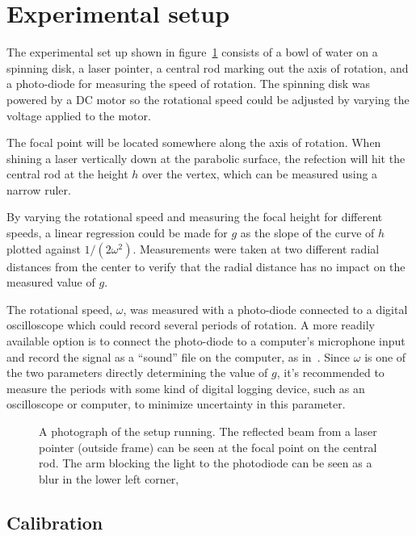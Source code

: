 \documentclass[12pt, a4paper, twocolumn]{article}
\begin{document}
\section{Experimental setup}

The experimental set up shown in figure~\ref{fig:rot_bowl_pic} consists of a bowl of water on a spinning disk, a laser pointer, a central rod marking out the axis of rotation, and a photo-diode for measuring the speed of rotation. The spinning disk was powered by a DC motor so the rotational speed could be adjusted by varying the voltage applied to the motor. 

The focal point will be located somewhere along the axis of rotation. When shining a laser vertically down at the parabolic surface, the refection will hit the central rod at the height $h$ over the vertex, which can be measured using a narrow ruler. 

By varying the rotational speed and measuring the focal height for
different speeds, a linear regression could be made for $g$ as the
slope of the curve of $h$ plotted against $1/(2\omega^2)$. 
Measurements were taken at two different radial distances from the
center to verify that the radial distance has no impact on the measured value of $g$. 

The rotational speed, $\omega$, was measured with a photo-diode connected to a digital oscilloscope which could record several periods of rotation. A more readily available option is to connect the photo-diode to a computer's microphone input and record the signal as a ``sound'' file on the computer, as in~\cite{Sabatka2010}. Since $\omega$ is one of the two parameters directly determining the value of $g$, it's recommended to measure the periods with some kind of digital logging device, such as an oscilloscope or computer, to minimize uncertainty in this parameter.

\begin{figure}
\centering
\resizebox{6cm}{!}{}
\caption{A photograph of the setup running. The reflected beam from a laser pointer (outside frame) can be seen at the focal point on the central rod. The arm blocking the light to the photodiode can be seen as a blur in the lower left corner, } 
\label{fig:rot_bowl_pic} 
\end{figure}

\subsection{Calibration}
\end{document}
